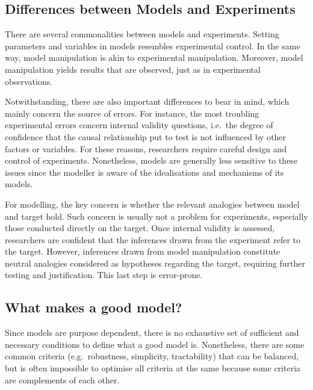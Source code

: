 \documentclass[
]{book}
\begin{document}
\hypertarget{differences-between-models-and-experiments}{%
\subsection{Differences between Models and Experiments}\label{differences-between-models-and-experiments}}

There are several commonalities between models and experiments. Setting parameters and variables in models resembles experimental control. In the same way, model manipulation is akin to experimental manipulation. Moreover, model manipulation yields results that are observed, just as in experimental observations.

Notwithstanding, there are also important differences to bear in mind, which mainly concern the source of errors. For instance, the most troubling experimental errors concern internal validity questions, i.e.~the degree of confidence that the causal relationship put to test is not influenced by other factors or variables. For these reasons, researchers require careful design and control of experiments. Nonetheless, models are generally less sensitive to these issues since the modeller is aware of the idealisations and mechanisms of its models.

For modelling, the key concern is whether the relevant analogies between model and target hold. Such concern is usually not a problem for experiments, especially those conducted directly on the target. Once internal validity is assessed, researchers are confident that the inferences drawn from the experiment refer to the target. However, inferences drawn from model manipulation constitute neutral analogies considered as hypotheses regarding the target, requiring further testing and justification. This last step is error-prone.

\hypertarget{what-makes-a-good-model}{%
\subsection{What makes a good model?}\label{what-makes-a-good-model}}

Since models are purpose dependent, there is no exhaustive set of sufficient and necessary conditions to define what a good model is. Nonetheless, there are some common criteria (e.g.~robustness, simplicity, tractability) that can be balanced, but is often impossible to optimise all criteria at the same because some criteria are complements of each other.
\end{document}
